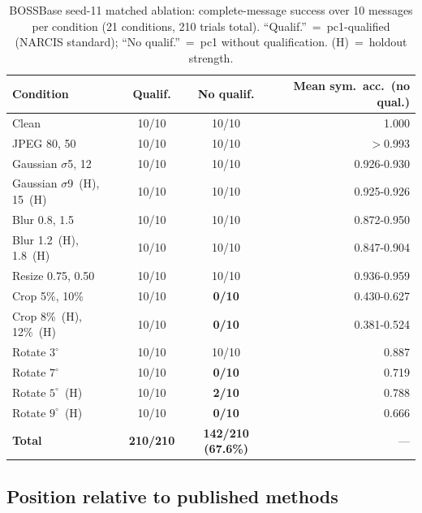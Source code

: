 \documentclass[10pt,journal]{IEEEtran}
\newcommand{\method}{NARCIS\xspace}
\begin{document}
\begin{table}[t]
\centering
\caption{BOSSBase seed-11 matched ablation: complete-message success over 10 messages
  per condition (21 conditions, 210 trials total). ``Qualif.''~=~pc1-qualified
  (\method standard); ``No qualif.''~=~pc1 without qualification. (H)~=~holdout strength.}
\label{tab:ablation_boss}
\small
\begin{tabular}{lccr}
\toprule
Condition & Qualif. & No qualif. & Mean sym.\ acc.\ (no qual.)\\
\midrule
Clean                      & 10/10 & 10/10              & 1.000 \\
JPEG 80, 50                & 10/10 & 10/10              & $>$0.993 \\
Gaussian $\sigma$5, 12     & 10/10 & 10/10              & 0.926-0.930 \\
Gaussian $\sigma$9~(H), 15~(H) & 10/10 & 10/10         & 0.925-0.926 \\
Blur 0.8, 1.5              & 10/10 & 10/10              & 0.872-0.950 \\
Blur 1.2~(H), 1.8~(H)     & 10/10 & 10/10              & 0.847-0.904 \\
Resize 0.75, 0.50          & 10/10 & 10/10              & 0.936-0.959 \\
Crop 5\%, 10\%             & 10/10 & \textbf{0/10}      & 0.430-0.627 \\
Crop 8\%~(H), 12\%~(H)    & 10/10 & \textbf{0/10}      & 0.381-0.524 \\
Rotate $3^\circ$           & 10/10 & 10/10              & 0.887 \\
Rotate $7^\circ$           & 10/10 & \textbf{0/10}      & 0.719 \\
Rotate $5^\circ$~(H)       & 10/10 & \textbf{2/10}      & 0.788 \\
Rotate $9^\circ$~(H)       & 10/10 & \textbf{0/10}      & 0.666 \\
\midrule
\textbf{Total}             & \textbf{210/210} & \textbf{142/210 (67.6\%)} & --- \\
\bottomrule
\end{tabular}
\end{table}

\subsection{Position relative to published methods}
\end{document}
